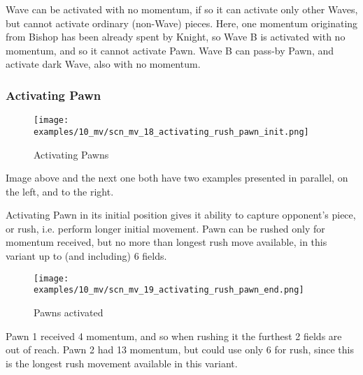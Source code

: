 Wave can be activated with no momentum, if so it can activate only other Waves, but
cannot activate ordinary (non-Wave) pieces. Here, one momentum originating from Bishop
has been already spent by Knight, so Wave B is activated with no momentum, and so it
cannot activate Pawn. Wave B can pass-by Pawn, and activate dark Wave, also with no
momentum.

\clearpage %

\subsubsection*{Activating Pawn}

\vspace*{-1.4\baselineskip}
\noindent
\begin{figure}[!h]
\texttt{[image: examples/10\_mv/scn\_mv\_18\_activating\_rush\_pawn\_init.png]}
\vspace*{-1.3\baselineskip}
\caption{Activating Pawns}
\label{fig:scn_mv_18_activating_rush_pawn_init}
\end{figure}

\vspace*{-0.3\baselineskip}
Image above and the next one both have two examples presented in parallel, on the left,
and to the right.

Activating Pawn in its initial position gives it ability to capture opponent's
piece, or rush, i.e. perform longer initial movement. Pawn can be rushed only for
momentum received, but no more than longest rush move available, in this variant
up to (and including) 6 fields.

\clearpage %

\vspace*{-2.1\baselineskip}
\noindent
\begin{figure}[!h]
\texttt{[image: examples/10\_mv/scn\_mv\_19\_activating\_rush\_pawn\_end.png]}
\caption{Pawns activated}
\label{fig:scn_mv_19_activating_rush_pawn_end}
\end{figure}

Pawn 1 received 4 momentum, and so when rushing it the furthest 2 fields are out
of reach. Pawn 2 had 13 momentum, but could use only 6 for rush, since this is the
longest rush movement available in this variant.

